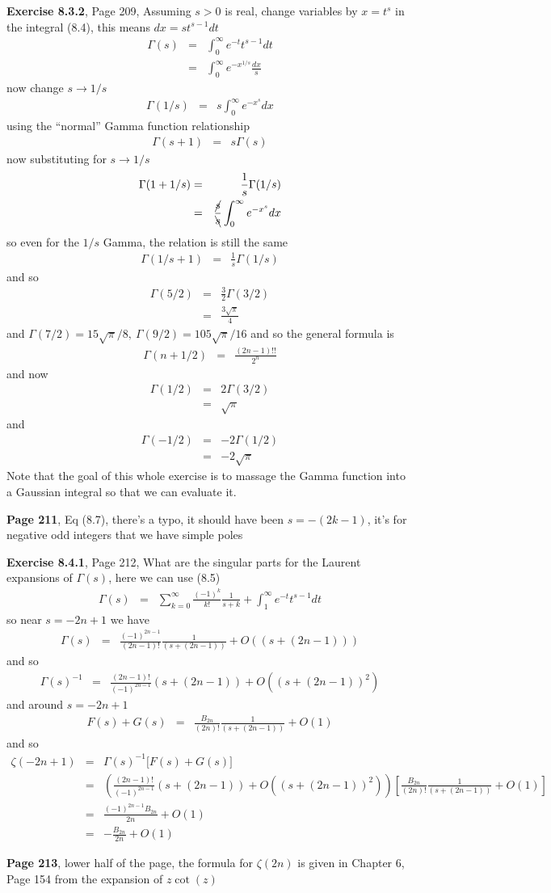 \documentclass[aps,preprint,preprintnumbers,nofootinbib,showpacs,prd]{revtex4-1}
\newcommand{\nbea}{\begin{eqnarray*}}
\newcommand{\neea}{\end{eqnarray*}}
\begin{document}
{\bf Exercise 8.3.2}, Page 209, Assuming $s>0$ is real, change variables by $x=t^s$ in the integral (8.4), this means $dx=st^{s-1}dt$
%
\nbea
\Gamma(s) & = & \int_0^\infty e^{-t}t^{s-1}dt \\
& = & \int_0^\infty e^{-x^{1/s}} \frac{dx}{s}
\neea
%
now change $s\to 1/s$
%
\nbea
\Gamma(1/s) & = & s \int_0^\infty e^{-x^s} dx
\neea
%
using the ``normal'' Gamma function relationship
%
\nbea
\Gamma(s+1) & = & s\Gamma(s)
\neea
%
now substituting for $s\to1/s$
%
\nbea
\Gamma(1+1/s) & = & \frac{1}{s}\Gamma(1/s) \\
& = & \frac{\cancel{s}}{\bcancel{s}} \int_0^\infty e^{-x^s} dx
\neea
%
so even for the $1/s$ Gamma, the relation is still the same
%
\nbea
\Gamma(1/s+1) & = & \frac{1}{s}\Gamma(1/s)
\neea
%
and so
%
\nbea
\Gamma(5/2) & = & \frac{3}{2} \Gamma(3/2) \\
& = & \frac{3\sqrt{\pi}}{4}
\neea
%
and $\Gamma(7/2) = 15\sqrt{\pi}/8,~\Gamma(9/2) = 105\sqrt{\pi}/16$ and so the general formula is
%
\nbea
\Gamma(n+1/2) & = & \frac{(2n-1)!!}{2^n}
\neea
%
and now
%
\nbea
\Gamma(1/2) & = & 2 \Gamma(3/2) \\
& = & \sqrt{\pi}
\neea
%
and
%
\nbea
\Gamma(-1/2) & = & -2 \Gamma(1/2) \\
& = & -2\sqrt{\pi}
\neea
%
Note that the goal of this whole exercise is to massage the Gamma function into a Gaussian integral so that we can evaluate it.

{\bf Page 211}, Eq (8.7), there's a typo, it should have been $s=-(2k-1)$, it's for negative odd integers that we have simple poles

{\bf Exercise 8.4.1}, Page 212, What are the singular parts for the Laurent expansions of $\Gamma(s)$, here we can use (8.5)
%
\nbea
\Gamma(s) & = & \sum_{k=0}^\infty \frac{(-1)^k}{k!} \frac{1}{s+k} + \int_1^\infty e^{-t}t^{s-1}dt
\neea
%
so near $s=-2n+1$ we have
%
\nbea
\Gamma(s) & = & \frac{(-1)^{2n-1}}{(2n-1)!} \frac{1}{(s+(2n-1))} + O((s+(2n-1)))
\neea
%
and so
%
\nbea
\Gamma(s)^{-1} & = & \frac{(2n-1)!}{(-1)^{2n-1}} (s+(2n-1)) + O((s+(2n-1))^2)
\neea
%
and around $s=-2n+1$
%
\nbea
F(s) + G(s) & = & \frac{B_{2n}}{(2n)!}\frac{1}{(s + (2n-1))} + O(1)
\neea
%
and so
%
\nbea
\zeta(-2n+1) & = & \Gamma(s)^{-1} \lbrack F(s) + G(s)\rbrack\\
& = & \left(\frac{(2n-1)!}{(-1)^{2n-1}} (s+(2n-1)) + O((s+(2n-1))^2)\right) \left\lbrack  \frac{B_{2n}}{(2n)!}\frac{1}{(s + (2n-1))} + O(1) \right\rbrack \\
& = & \frac{(-1)^{2n-1}B_{2n}}{2n} + O(1) \\
& = & -\frac{B_{2n}}{2n} + O(1)
\neea
%

{\bf Page 213}, lower half of the page, the formula for $\zeta(2n)$ is given in Chapter 6, Page 154 from the expansion of $z\cot(z)$
\end{document}
